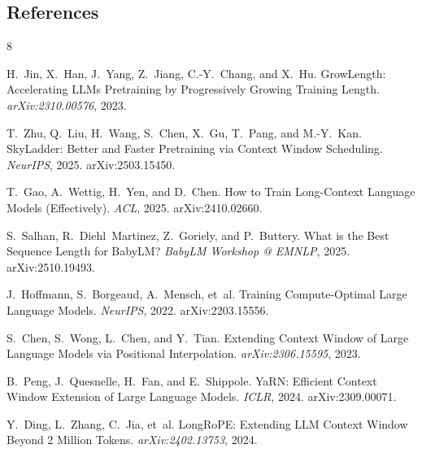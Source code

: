 \documentclass[11pt]{article}
\begin{document}
\subsection*{References}
\begin{thebibliography}{8}

H.~Jin, X.~Han, J.~Yang, Z.~Jiang, C.-Y.~Chang, and X.~Hu.
\newblock GrowLength: Accelerating LLMs Pretraining by Progressively Growing Training Length.
\newblock \textit{arXiv:2310.00576}, 2023.

T.~Zhu, Q.~Liu, H.~Wang, S.~Chen, X.~Gu, T.~Pang, and M.-Y.~Kan.
\newblock SkyLadder: Better and Faster Pretraining via Context Window Scheduling.
\newblock \textit{NeurIPS}, 2025. arXiv:2503.15450.

T.~Gao, A.~Wettig, H.~Yen, and D.~Chen.
\newblock How to Train Long-Context Language Models (Effectively).
\newblock \textit{ACL}, 2025. arXiv:2410.02660.

S.~Salhan, R.~Diehl~Martinez, Z.~Goriely, and P.~Buttery.
\newblock What is the Best Sequence Length for BabyLM?
\newblock \textit{BabyLM Workshop @ EMNLP}, 2025. arXiv:2510.19493.

J.~Hoffmann, S.~Borgeaud, A.~Mensch, et~al.
\newblock Training Compute-Optimal Large Language Models.
\newblock \textit{NeurIPS}, 2022. arXiv:2203.15556.

S.~Chen, S.~Wong, L.~Chen, and Y.~Tian.
\newblock Extending Context Window of Large Language Models via Positional Interpolation.
\newblock \textit{arXiv:2306.15595}, 2023.

B.~Peng, J.~Quesnelle, H.~Fan, and E.~Shippole.
\newblock YaRN: Efficient Context Window Extension of Large Language Models.
\newblock \textit{ICLR}, 2024. arXiv:2309.00071.

Y.~Ding, L.~Zhang, C.~Jia, et~al.
\newblock LongRoPE: Extending LLM Context Window Beyond 2 Million Tokens.
\newblock \textit{arXiv:2402.13753}, 2024.

\end{thebibliography}
\end{document}
